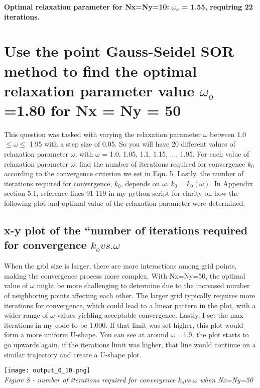 \documentclass[a4paper, twoside]{article}
\begin{document}
\textbf{Optimal relaxation parameter for Nx=Ny=10: $\omega_o$ = 1.55, requiring 22 iterations.}

\newpage 
\section{Use the point Gauss-Seidel SOR method to find the optimal relaxation parameter value $\omega _o$ =1.80 for Nx = Ny = 50}
This question was tasked with varying the relaxation parameter $\omega$ between 1.0 $\leq \omega \leq $ 1.95 with a step size of 0.05. So you will have 20 different values of relaxation parameter $\omega$, with $\omega$ = 1.0, 1.05, 1.1, 1.15, ..., 1.95. For each value of relaxation parameter $\omega$, find the number of iterations required for convergence $k_0$ according to the convergence criterion we set in Eqn. 5. Lastly, the number of iterations required for convergence, $k_0$, depends on $\omega$. $k_0 = k_0(\omega)$. In Appendix section 5.1, reference lines 91-119 in my python script for clarity on how the following plot and optimal value of the relaxation parameter were determined.

\subsection{x-y plot of the “number of iterations required for convergence $k_o vs. \omega$}
When the grid size is larger, there are more interactions among grid points, making the convergence process more complex. With Nx=Ny=50, the optimal value of $\omega$ might be more challenging to determine due to the increased number of neighboring points affecting each other. The larger grid typically requires more iterations for convergence, which could lead to a linear pattern in the plot, with a wider range of $\omega$ values yielding acceptable convergence. Lastly, I set the max iterations in my code to be 1,000. If that limit was set higher, this plot would form a more uniform U-shape. You can see at around $\omega$ =1.9, the plot starts to go upwards again, if the iterations limit was higher, that line would continue on a similar trajectory and create a U-shape plot. 
\begin{center}
    \texttt{[image: output\_0\_10.png]} \\
    \textit{Figure 8 - number of iterations required for convergence $k_o vs. \omega$ when Nx=Ny=50 }
\end{center}

\newpage
\end{document}
